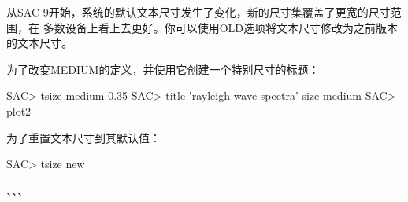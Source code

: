 从SAC 9开始，系统的默认文本尺寸发生了变化，新的尺寸集覆盖了更宽的尺寸范围，在
多数设备上看上去更好。你可以使用OLD选项将文本尺寸修改为之前版本的文本尺寸。

为了改变MEDIUM的定义，并使用它创建一个特别尺寸的标题：
\begin{SACCode}
SAC> tsize medium 0.35
SAC> title 'rayleigh wave spectra' size medium
SAC> plot2
\end{SACCode}

为了重置文本尺寸到其默认值：
\begin{SACCode}
SAC> tsize new
\end{SACCode}

、、、
